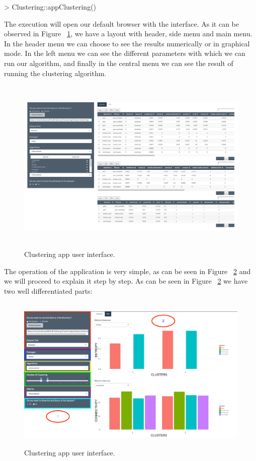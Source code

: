 \begin{Schunk}
\begin{Sinput}
> Clustering::appClustering()
\end{Sinput}
\end{Schunk}

The execution will open our default browser with the interface. As it can be observed in Figure ~\ref{fig:layoutApp}, we have a layout with header, side menu and main menu. In the header menu we can choose to see the results numerically or in graphical mode. In the left menu we can see the different parameters with which we can run our algorithm, and finally in the central menu we can see the result of running the clustering algorithm.

\begin{figure}[htbp]
  \centering
   \includegraphics[width=14cm, height=8.5cm]{img/app}
    \caption{Clustering app user interface.}
    \label{fig:layoutApp}%
\end{figure}
The operation of the application is very simple, as can be seen in Figure ~\ref{fig:layoutApp1} and we will proceed to explain it step by step.
As can be seen in Figure ~\ref{fig:layoutApp1} we have two well differentiated parts:
\clearpage
\begin{figure}[htbp]
  \centering
   \includegraphics[width=14cm, height=7.5cm]{img/app1}
    \caption{Clustering app user interface.}
    \label{fig:layoutApp1}%
\end{figure}

